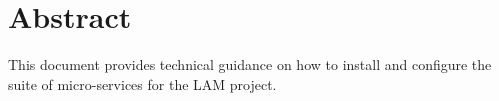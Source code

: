 \section*{Abstract}

	This document provides technical guidance on how to install and configure the suite of micro-services for the LAM project.
	
	
